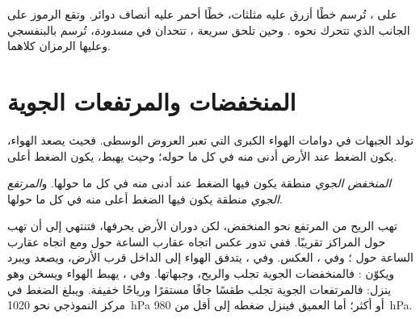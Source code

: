 على  ، تُرسم  خطًا أزرق عليه مثلثات، 
خطًا أحمر عليه أنصاف دوائر. وتقع الرموز على الجانب الذي تتحرك نحوه .
وحين تلحق  سريعة ، تتحدان في \emph{ مسدودة}،
تُرسم بالبنفسجي وعليها الرمزان كلاهما.

\section{المنخفضات والمرتفعات الجوية}

تولد الجبهات في دوامات الهواء الكبرى التي تعبر العروض الوسطى. فحيث يصعد
الهواء، يكون الضغط عند الأرض أدنى منه في كل ما حوله؛ وحيث يهبط، يكون الضغط
أعلى.

\begin{definition}\label{def:g8:fronts-and-weather-maps:depression}
\emph{المنخفض الجوي} منطقة يكون فيها الضغط عند  أدنى منه في كل ما حولها. و\emph{المرتفع الجوي}
منطقة يكون فيها الضغط أعلى منه في كل ما حولها.
\end{definition}
\label{def:g8:fronts-and-weather-maps:anticyclone}

تهب الريح من المرتفع نحو المنخفض، لكن دوران الأرض يحرفها، فتنتهي إلى أن
تهب حول المراكز تقريبًا. ففي  تدور عكس اتجاه عقارب الساعة
حول  ومع اتجاه عقارب الساعة حول ؛ وفي ، العكس. وفي ، يتدفق الهواء إلى الداخل قرب الأرض، ويصعد
ويبرد ويكوّن : فالمنخفضات الجوية تجلب   والريح، وجبهاتها.
وفي ، يهبط الهواء ويسخن وهو ينزل: فالمرتفعات الجوية تجلب طقسًا
جافًا مستقرًا ورياحًا خفيفة. ويبلغ الضغط في مركز  النموذجي نحو
\qty{1020}{hPa} أو أكثر؛ أما  العميق فينزل ضغطه إلى أقل من
\qty{980}{hPa}.

